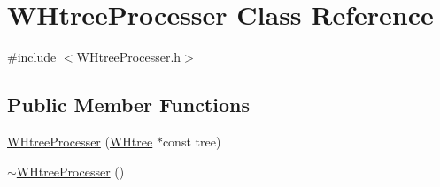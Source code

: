 \hypertarget{classWHtreeProcesser}{\section{\-W\-Htree\-Processer \-Class \-Reference}
\label{classWHtreeProcesser}
}


{\ttfamily \#include $<$\-W\-Htree\-Processer.\-h$>$}

\subsection*{\-Public \-Member \-Functions}
\begin{DoxyCompactItemize}
\item 
\hyperlink{classWHtreeProcesser_aa3d3b8dd2d1af65ddfc492c1205d05b1}{\-W\-Htree\-Processer} (\hyperlink{classWHtree}{\-W\-Htree} $\ast$const tree)
\item 
\hypertarget{classWHtreeProcesser_a8455d95461bf78af4a03782b6d7d9193}{\hyperlink{classWHtreeProcesser_a8455d95461bf78af4a03782b6d7d9193}{$\sim$\-W\-Htree\-Processer} ()}\label{classWHtreeProcesser_a8455d95461bf78af4a03782b6d7d9193}


\end{DoxyCompactItemize}
